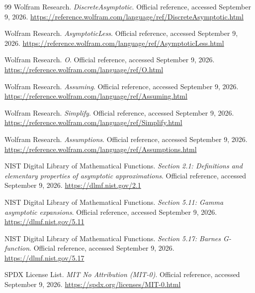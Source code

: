 \begin{thebibliography}{99}
 Wolfram Research. \emph{DiscreteAsymptotic}. Official reference, accessed September 9, 2026. \url{https://reference.wolfram.com/language/ref/DiscreteAsymptotic.html}

 Wolfram Research. \emph{AsymptoticLess}. Official reference, accessed September 9, 2026. \url{https://reference.wolfram.com/language/ref/AsymptoticLess.html}

 Wolfram Research. \emph{O}. Official reference, accessed September 9, 2026. \url{https://reference.wolfram.com/language/ref/O.html}

 Wolfram Research. \emph{Assuming}. Official reference, accessed September 9, 2026. \url{https://reference.wolfram.com/language/ref/Assuming.html}

 Wolfram Research. \emph{Simplify}. Official reference, accessed September 9, 2026. \url{https://reference.wolfram.com/language/ref/Simplify.html}

 Wolfram Research. \emph{Assumptions}. Official reference, accessed September 9, 2026. \url{https://reference.wolfram.com/language/ref/Assumptions.html}

 NIST Digital Library of Mathematical Functions. \emph{Section 2.1: Definitions and elementary properties of asymptotic approximations}. Official reference, accessed September 9, 2026. \url{https://dlmf.nist.gov/2.1}

 NIST Digital Library of Mathematical Functions. \emph{Section 5.11: Gamma asymptotic expansions}. Official reference, accessed September 9, 2026. \url{https://dlmf.nist.gov/5.11}

 NIST Digital Library of Mathematical Functions. \emph{Section 5.17: Barnes G-function}. Official reference, accessed September 9, 2026. \url{https://dlmf.nist.gov/5.17}

 SPDX License List. \emph{MIT No Attribution (MIT-0)}. Official reference, accessed September 9, 2026. \url{https://spdx.org/licenses/MIT-0.html}

\end{thebibliography}
